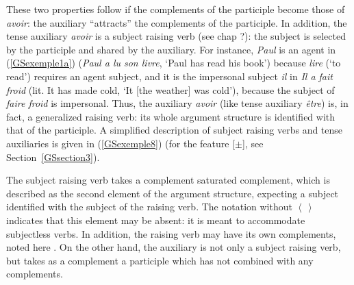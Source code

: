 \documentclass[output=paper
                ,modfonts
                ,nonflat
	        ,collection
	        ,collectionchapter
	        ,collectiontoclongg
 	        ,biblatex
                ,babelshorthands
                ,newtxmath
                ,draftmode
                ,colorlinks, citecolor=brown
]{./langsci/langscibook}
\begin{document}
{These two properties follow if the complements of the participle become those of \emph{avoir}: the auxiliary ``attracts'' the complements of the participle. In addition, the tense auxiliary \emph{avoir} is a subject raising verb (see chap ?): the subject is selected by the participle and shared by the auxiliary. For instance, \emph{Paul} is an agent in (\ref{GSexemple1a}) (\emph{Paul a lu son livre}, `Paul has read his book') because \emph{lire} (`to read') requires an agent subject, and it is the impersonal subject \emph{il} in \emph{Il a fait froid} (lit. It has made cold, `It [the weather] was cold'), because the subject of \emph{faire froid} is impersonal. Thus, the auxiliary \emph{avoir} (like tense auxiliary \emph{\^etre}) is, in fact, a generalized raising verb: its whole argument structure is identified with that of the participle. A simplified description of subject raising verbs and tense auxiliaries is given in (\ref{GSexemple8}) (for the feature [\light$\pm$], see Section~\ref{GSsection3}).

\begin{exe}
	\ex 	\label{GSexemple8}
	\begin{xlist}
	
	\end{xlist}
\end{exe}

The subject raising verb takes a complement saturated complement, which is described as the second element of the argument structure, expecting a subject  identified with the subject of the raising verb. The notation  without $\left< \, \right>$ indicates that this element may be absent: it is meant to accommodate subjectless verbs. In addition, the raising verb may have its own complements, noted here . On the other hand, the auxiliary is not only a subject raising verb, but takes as a complement a participle which has not combined with any complements.

}
\end{document}
